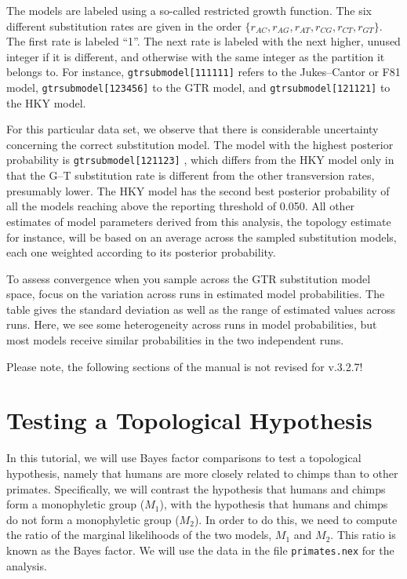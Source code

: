 \documentclass[12pt]{book}
\newcommand{\ttt}[1]{\texttt{#1} }
\begin{document}
The models are labeled using a so-called restricted growth function. The six different substitution
rates are given in the order $\{r_{AC},r_{AG},r_{AT},r_{CG},r_{CT},r_{GT}\}$. The first rate is
labeled ``1''. The next rate is labeled with the next higher, unused integer if it is different,
and otherwise with the same integer as the partition it belongs to. For instance,
\ttt{gtrsubmodel[111111]} refers to the Jukes--Cantor or F81 model, \ttt{gtrsubmodel[123456]}
to the GTR model, and \ttt{gtrsubmodel[121121]} to the HKY model.

For this particular data set, we observe that there is considerable uncertainty concerning the
correct substitution model. The model with the highest posterior probability is
\ttt{gtrsubmodel[121123]}, which differs from the HKY model only in that the G--T substitution
rate is different from the other transversion rates, presumably lower. The HKY model has the second
best posterior probability of all the models reaching above the reporting threshold of 0.050. All
other estimates of model parameters derived from this analysis, the topology estimate for instance,
will be based on an average across the sampled substitution models, each one weighted according to
its posterior probability.

To assess convergence when you sample across the GTR substitution model space, focus on the
variation across runs in estimated model probabilities. The table gives the standard deviation as
well as the range of estimated values across runs. Here, we see some heterogeneity across runs in
model probabilities, but most models receive similar probabilities in the two independent runs.

\vspace{10 pt}
{\LARGE Please note, the following sections of the manual is not revised for v.3.2.7!}

\section{Testing a Topological Hypothesis}

In this tutorial, we will use Bayes factor comparisons to test a topological hypothesis, namely
that humans are more closely related to chimps than to other primates. Specifically, we will
contrast the hypothesis that humans and chimps form a monophyletic group ($M_1$), with the
hypothesis that humans and chimps do not form a monophyletic group ($M_2$).  In order to do this,
we need to compute the ratio of the marginal likelihoods of the two models, $M_1$ and $M_2$.  This
ratio is known as the Bayes factor. We will use the data in the file \ttt{primates.nex} for the
analysis.
\end{document}
